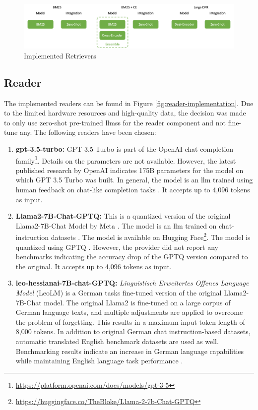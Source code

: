 \begin{figure}
    \centering
    \includegraphics[width=\textwidth]{Grafiken/Evaluation/retriever_implemented.png}    
    \caption{Implemented Retrievers}
    \label{fig:retriever-implementation}
\end{figure}

\subsection{Reader}
\label{subsec:reader-impl}

The implemented readers can be found in Figure \ref{fig:reader-implementation}. Due to the limited hardware resources and high-quality data, the decision was made to only use zero-shot pre-trained \glspl{llm}s for the reader component and not fine-tune any. The following readers have been chosen:

\begin{enumerate}
    \item \textbf{gpt-3.5-turbo:} GPT 3.5 Turbo is part of the OpenAI chat completion family\footnote{\url{https://platform.openai.com/docs/models/gpt-3-5}}. Details on the parameters are not available. However, the latest published research by OpenAI indicates 175B parameters for the model on which GPT 3.5 Turbo was built. In general, the model is an \gls{llm} trained using human feedback on chat-like completion tasks \cite{ouyang_training_2022}. It accepts up to 4,096 tokens as input.
    \item \textbf{Llama2-7B-Chat-GPTQ:} This is a quantized version of the original Llama2-7B-Chat Model by Meta \cite{touvron_llama_2023}. The model is an \gls{llm} trained on chat-instruction datasets \cite{ouyang_training_2022}. The model is available on Hugging Face\footnote{\url{https://huggingface.co/TheBloke/Llama-2-7b-Chat-GPTQ}}. The model is quantized using GPTQ \cite{muennighoff_sgpt_2022}. However, the provider did not report any benchmarks indicating the accuracy drop of the GPTQ version compared to the original. It accepts up to 4,096 tokens as input.
    \item \textbf{leo-hessianai-7B-chat-GPTQ:} \textit{Linguistisch Erweitertes Offenes Language Model} (LeoLM) is a German tasks fine-tuned version of the original Llama2-7B-Chat model. The original Llama2 is fine-tuned on a large corpus of German language texts, and multiple adjustments are applied to overcome the problem of forgetting. This results in a maximum input token length of 8,000 tokens. In addition to original German chat instruction-based datasets, automatic translated English benchmark datasets are used as well. Benchmarking results indicate an increase in German language capabilities while maintaining English language task performance \cite{pluster_leolm_nodate}.
\end{enumerate}

